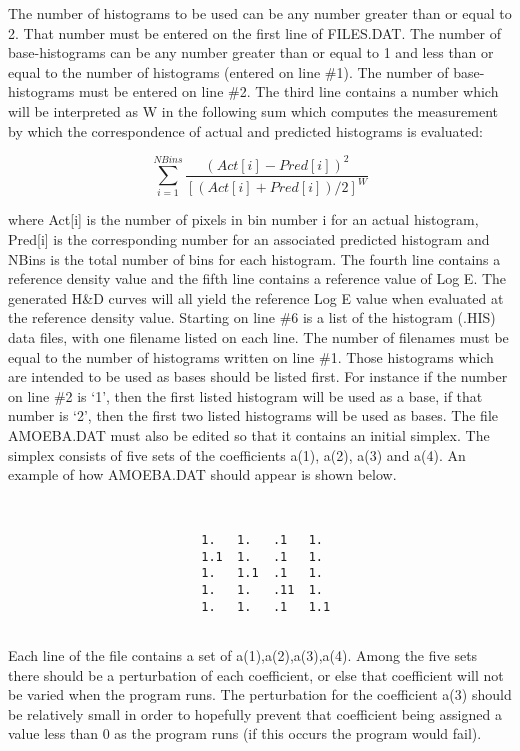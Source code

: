       The number of histograms to be used can be any number greater than
   or equal to 2.  That number must be entered on the first line of
   FILES.DAT.  The number of base-histograms can be any number greater
   than or equal to 1 and less than or equal to the number of histograms
   (entered on line \#1).  The number of base-histograms must be entered on
   line \#2.  The third line contains a number which will be interpreted as
   W in the following sum which computes the measurement by which the
   correspondence of actual and predicted histograms is evaluated:
\begin{center}
\begin{displaymath}
 \sum_{i=1}^{NBins} \frac{(Act[i]-Pred[i])^{2}}{[(Act[i]+Pred[i])/2]^{W}}    
\end{displaymath}                
\end{center}   
   where Act[i] is the number of pixels in bin number i for an actual
   histogram, Pred[i] is the corresponding number for an associated
   predicted histogram and NBins is the total number of bins for each
   histogram.
      The fourth line contains a reference density value and the fifth line
   contains a reference value of Log E.  The generated H\&D curves will all
   yield the reference Log E value when evaluated at the reference density
   value.
      Starting on line \#6 is a list of the histogram (.HIS) data files,
   with one filename listed on each line.  The number of filenames must be
   equal to the number of histograms written on line \#1.  Those histograms
   which are intended to be used as bases should be listed first.  For
   instance if the number on line \#2 is `1', then the first listed
   histogram will be used as a base, if that number is `2', then the first
   two listed histograms will be used as bases.
      The file AMOEBA.DAT must also be edited so that it contains an
   initial simplex.  The simplex consists of five sets of the coefficients
   a(1), a(2), a(3) and a(4).  An example of how AMOEBA.DAT should appear
   is shown below.
\begin{center}
\begin{verbatim}      
   
                         
                           1.   1.   .1   1.  
                           1.1  1.   .1   1.  
                           1.   1.1  .1   1.  
                           1.   1.   .11  1.  
                           1.   1.   .1   1.1 
            
\end{verbatim}   
\end{center}
      Each line of the file contains a set of {a(1),a(2),a(3),a(4)}.
   Among the five sets there should be a perturbation of each coefficient,
   or else that coefficient will not be varied when the program runs.  The
   perturbation for the coefficient a(3) should be relatively small in
   order to hopefully prevent that coefficient being assigned a value less
   than 0 as the program runs (if this occurs the program would fail).
   
